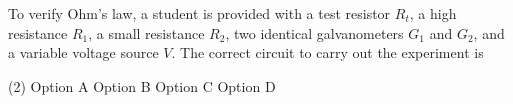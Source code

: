 
\item To verify Ohm's law, a student is provided with a test resistor \( R_t \), a high resistance \( R_1 \), a small resistance \( R_2 \), two identical galvanometers \( G_1 \) and \( G_2 \), and a variable voltage source \( V \). The correct circuit to carry out the experiment is
    \begin{center}
    \end{center}
    \begin{tasks}(2)
        \task Option A
        \task Option B
        \task Option C\ans
        \task Option D
    \end{tasks}
